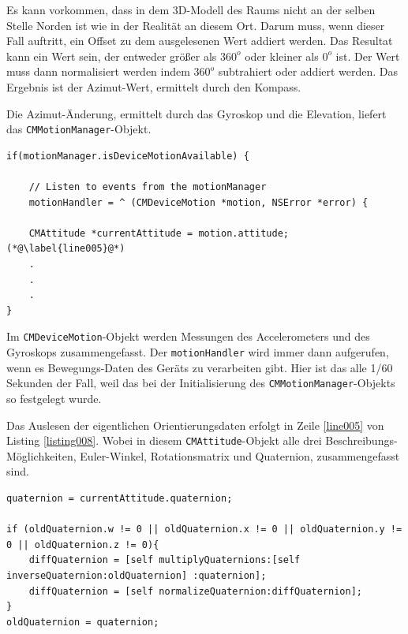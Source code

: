 Es kann vorkommen, dass in dem 3D-Modell des Raums nicht an der selben Stelle Norden ist wie in der Realität an diesem Ort. Darum muss, wenn dieser Fall auftritt, ein Offset zu dem ausgelesenen Wert addiert werden. Das Resultat kann ein Wert sein, der entweder größer als $360^o$ oder kleiner als $0^o$ ist. Der Wert muss dann normalisiert werden indem $360^o$ subtrahiert oder addiert werden. Das Ergebnis ist der Azimut-Wert, ermittelt durch den Kompass.

Die Azimut-Änderung, ermittelt durch das Gyroskop und die Elevation, liefert das \texttt{CMMotionManager}-Objekt.
~\\
\begin{lstlisting}[float=htb, caption=Bewegungsdaten auslesen \cite{apple:003}, label=listing008]
if(motionManager.isDeviceMotionAvailable) {
        
	// Listen to events from the motionManager
	motionHandler = ^ (CMDeviceMotion *motion, NSError *error) {
	
	CMAttitude *currentAttitude = motion.attitude;(*@\label{line005}@*)
	.
	.
	.
}
\end{lstlisting}

Im \texttt{CMDeviceMotion}-Objekt werden Messungen des Accelerometers und des Gyroskops zusammengefasst. Der \texttt{motionHandler} wird immer dann aufgerufen, wenn es Bewegungs-Daten des Geräts zu verarbeiten gibt. Hier ist das alle 1/60 Sekunden der Fall, weil das bei der Initialisierung des \texttt{CMMotionManager}-Objekts so festgelegt wurde.

Das Auslesen der eigentlichen Orientierungsdaten erfolgt in Zeile \ref{line005} von Listing \ref{listing008}. Wobei in diesem \texttt{CMAttitude}-Objekt alle drei Beschreibungs-Möglichkeiten, Euler-Winkel, Rotationsmatrix und Quaternion, zusammengefasst sind.
~\\
\begin{lstlisting}[float=htb, caption=Azimut-Änderung berechnen, label=listing009]
quaternion = currentAttitude.quaternion;

if (oldQuaternion.w != 0 || oldQuaternion.x != 0 || oldQuaternion.y != 0 || oldQuaternion.z != 0){
	diffQuaternion = [self multiplyQuaternions:[self inverseQuaternion:oldQuaternion] :quaternion];
	diffQuaternion = [self normalizeQuaternion:diffQuaternion];
}            
oldQuaternion = quaternion;
\end{lstlisting}

